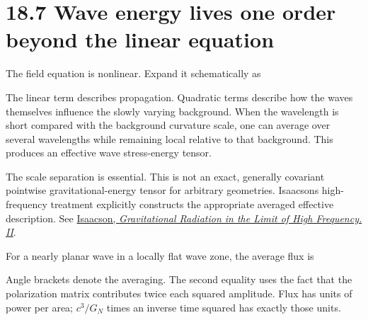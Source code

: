 \documentclass[
  11pt,
  letterpaper,
  oneside,
  openany]{scrbook}
\begin{document}
\hypertarget{wave-energy-lives-one-order-beyond-the-linear-equation}{%
\section{18.7 Wave energy lives one order beyond the linear
equation}\label{wave-energy-lives-one-order-beyond-the-linear-equation}}

The field equation is nonlinear. Expand it schematically as

\begin{center}
\begingroup
{}
\ifdim\wd\grmathbox>\linewidth
\resizebox{\linewidth}{!}{\usebox{\grmathbox}}
\else\usebox{\grmathbox}\fi
\endgroup
\end{center}

The linear term describes propagation. Quadratic terms describe how the
waves themselves influence the slowly varying background. When the
wavelength is short compared with the background curvature scale, one
can average over several wavelengths while remaining local relative to
that background. This produces an effective wave stress-energy tensor.

The scale separation is essential. This is not an exact, generally
covariant pointwise gravitational-energy tensor for arbitrary
geometries. Isaacson\textquotesingle s high-frequency treatment
explicitly constructs the appropriate averaged effective description.
See \href{https://doi.org/10.1103/PhysRev.166.1272}{Isaacson,
\emph{Gravitational Radiation in the Limit of High Frequency. II}}.

For a nearly planar wave in a locally flat wave zone, the average flux
is

\begin{center}
\begingroup
{}
\ifdim\wd\grmathbox>\linewidth
\resizebox{\linewidth}{!}{\usebox{\grmathbox}}
\else\usebox{\grmathbox}\fi
\endgroup
\end{center}

Angle brackets denote the averaging. The second equality uses the fact
that the polarization matrix contributes twice each squared amplitude.
Flux has units of power per area; \(c^3/G_N\) times an inverse time
squared has exactly those units.
\end{document}

